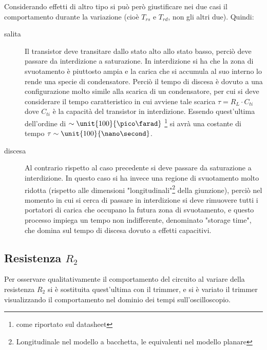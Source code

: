 \documentclass[10pt,a4paper]{article}
\begin{document}
Considerando effetti di altro tipo si può però giustificare nei due casi il comportamento durante la variazione (cioè $T_{rs}$ e $T_{rd}$, non gli altri due). Quindi:
\begin{description}
\item[salita] Il transistor deve transitare dallo stato alto allo stato basso, perciò deve passare da interdizione a saturazione. In interdizione si ha che la zona di svuotamento è piuttosto ampia e la carica che si accumula al suo interno lo rende una specie di condensatore. Perciò il tempo di discesa è dovuto a una configurazione molto simile alla scarica di un condensatore, per cui si deve considerare il tempo caratteristico in cui avviene tale scarica $\tau = R_L \cdot C_{ti}$ dove $C_{ti}$ è la capacità del transistor in interdizione. Essendo quest'ultima dell'ordine di $\sim \unit{100}{\pico\farad}$ \footnote{come riportato sul datasheet} si avrà una costante di tempo $\tau \sim \unit{100}{\nano\second}$.

\item[discesa] Al contrario rispetto al caso precedente si deve passare da saturazione a interdizione. In questo caso si ha invece una regione di svuotamento molto ridotta (rispetto alle dimensioni "longitudinali"\footnote{Longitudinale nel modello a bacchetta, le equivalenti nel modello planare} della giunzione), perciò nel momento in cui si cerca di passare in interdizione si deve rimuovere tutti i portatori di carica che occupano la futura zona di svuotamento, e questo processo impiega un tempo non indifferente, denominato "storage time", che domina sul tempo di discesa dovuto a effetti capacitivi.
\end{description}



\subsection{Resistenza $R_2$}
Per osservare qualitativamente il comportamento del circuito al variare della resistenza $R_2$ si è sostituita quest'ultima con il trimmer, e si è variato il trimmer visualizzando il comportamento nel dominio dei tempi sull'oscilloscopio.
\end{document}
